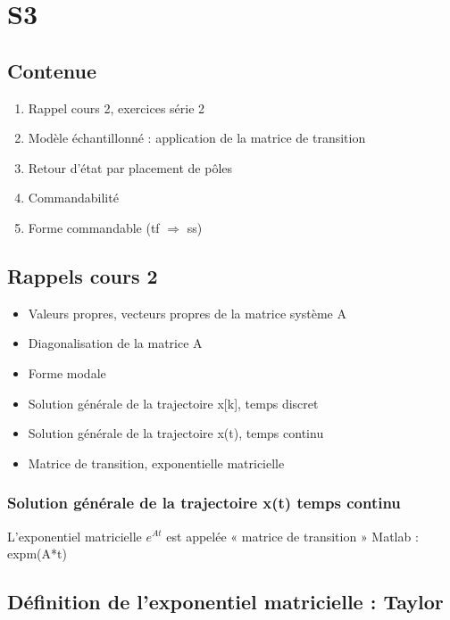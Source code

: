 \documentclass[document.tex]{subfiles}
\begin{document}
\section{S3}

\subsection{Contenue}

\begin{enumerate}
\item Rappel cours 2, exercices série 2
\item Modèle échantillonné : application de la matrice de transition
\item Retour d’état par placement de pôles
\item Commandabilité
\item Forme commandable  (tf $\Rightarrow$ ss)
\end{enumerate}

\subsection{Rappels cours 2}
\begin{itemize}
\item Valeurs propres, vecteurs propres de la matrice système A
\item Diagonalisation de la matrice A
\item Forme modale
\item Solution générale de la trajectoire x[k], temps discret
\item Solution générale de la trajectoire x(t), temps continu
\item Matrice de transition, exponentielle matricielle
\end{itemize}


\subsubsection{Solution générale de la trajectoire x(t) temps continu }


L'exponentiel matricielle $e^{A t}$ est appelée « matrice de transition » Matlab : expm(A*t)

\subsection{Définition de l'exponentiel matricielle : Taylor}
\end{document}
